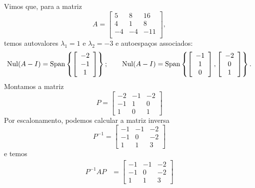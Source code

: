 \documentclass[../livro.tex]{subfiles}  %
\begin{document}
\begin{example}\label{exp:3x3denovo}
	Vimos que, para a matriz
	\begin{equation}
	A =
	\left[
	\begin{array}{ccc}
	5 & 8 & 16 \\
	4 & 1 & 8 \\
	-4 & -4 & -11 \\
	\end{array}
	\right],
	\end{equation} temos autovalores $\lambda_1 = 1$ e $\lambda_2 = -3$ e autoespaços associados:
	\begin{equation}
	\operatorname{Nul} (A - I) = \operatorname{Span} \left\{ \left[
	\begin{array}{c}
	-2 \\
	-1 \\
	1 \\
	\end{array}
	\right] \right\}; \qquad \operatorname{Nul} (A - I) = \operatorname{Span} \left\{ \left[
	\begin{array}{c}
	-1 \\
	1 \\
	0 \\
	\end{array}
	\right], \left[
	\begin{array}{ccc}
	-2 \\
	0 \\
	1 \\
	\end{array}
	\right] \right\}.
	\end{equation} Montamos a matriz
	\begin{equation}
	P =
	\begin{bmatrix}
	-2&-1&-2 \\ -1&1&0 \\ 1&0&1
	\end{bmatrix}
	\end{equation} Por escalonamento, podemos calcular a matriz inversa
	\begin{equation}
	P^{-1} =
	\begin{bmatrix}
	-1&-1&-2 \\ -1&0&-2 \\ 1&1&3
	\end{bmatrix}
	\end{equation} e temos
          \begin{align*}
	P^{-1} A P & =
	\begin{bmatrix}
	-1&-1&-2 \\ -1&0&-2 \\ 1&1&3

\end{bmatrix}
\end{align*}
\end{example}
\end{document}
